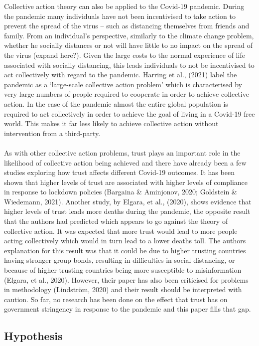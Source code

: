 \documentclass[
  11pt,
]{article}
\begin{document}
Collective action theory can also be applied to the Covid-19 pandemic. During the pandemic many individuals have not been incentivised to take action to prevent the spread of the virus -- such as distancing themselves from friends and family. From an individual's perspective, similarly to the climate change problem, whether he socially distances or not will have little to no impact on the spread of the virus (expand here?). Given the large costs to the normal experience of life associated with socially distancing, this leads individuals to not be incentivised to act collectively with regard to the pandemic. Harring et al., (2021) label the pandemic as a `large-scale collective action problem' which is characterised by very large numbers of people required to cooperate in order to achieve collective action. In the case of the pandemic almost the entire global population is required to act collectively in order to achieve the goal of living in a Covid-19 free world. This makes it far less likely to achieve collective action without intervention from a third-party.\\
~\\
As with other collective action problems, trust plays an important role in the likelihood of collective action being achieved and there have already been a few studies exploring how trust affects different Covid-19 outcomes. It has been shown that higher levels of trust are associated with higher levels of compliance in response to lockdown policies (Bargaina \& Aminjonov, 2020; Goldstein \& Wiedemann, 2021). Another study, by Elgara, et al., (2020), shows evidence that higher levels of trust leads more deaths during the pandemic, the opposite result that the authors had predicted which appears to go against the theory of collective action. It was expected that more trust would lead to more people acting collectively which would in turn lead to a lower deaths toll. The authors explanation for this result was that it could be due to higher trusting countries having stronger group bonds, resulting in difficulties in social distancing, or because of higher trusting countries being more susceptible to misinformation (Elgara, et al., 2020). However, their paper has also been criticised for problems in methodology (Lindström, 2020) and their result should be interpreted with caution. So far, no research has been done on the effect that trust has on government stringency in response to the pandemic and this paper fills that gap.\\

\hypertarget{hypothesis}{%
\subsection{Hypothesis}\label{hypothesis}}
\end{document}
